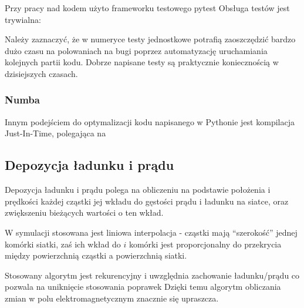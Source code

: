 Przy pracy nad kodem użyto frameworku testowego pytest %
Obsługa testów jest trywialna:

Należy zaznaczyć, że w numeryce testy jednostkowe potrafią zaoszczędzić bardzo dużo czasu na polowaniach na bugi
poprzez automatyzację uruchamiania kolejnych partii kodu. Dobrze napisane testy są praktycznie koniecznością w dzisiejszych
czasach. %

\subsubsection{Numba}

Innym podejściem do optymalizacji kodu napisanego w Pythonie jest kompilacja Just-In-Time, polegająca na %

\subsection{Depozycja ładunku i prądu}

Depozycja ładunku i prądu polega na obliczeniu na podstawie położenia i prędkości każdej cząstki jej wkładu do
gęstości prądu i ładunku na siatce, oraz zwiększeniu bieżących wartości o ten wkład.

W symulacji stosowana jest liniowa interpolacja - cząstki mają ``szerokość'' jednej komórki siatki, zaś ich wkład do $i$
komórki jest proporcjonalny do przekrycia między powierzchnią cząstki a powierzchnią siatki.

Stosowany algorytm jest rekurencyjny i uwzględnia zachowanie ładunku/prądu %
co pozwala na uniknięcie stosowania poprawek %
Dzięki temu algorytm obliczania zmian w polu elektromagnetycznym znacznie się upraszcza.


